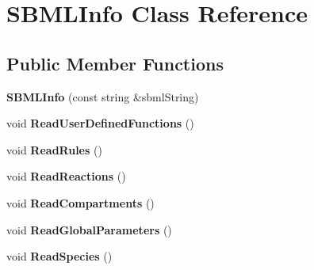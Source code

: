 \hypertarget{class_s_b_m_l_info}{\section{S\-B\-M\-L\-Info Class Reference}
\label{class_s_b_m_l_info}
}
\subsection*{Public Member Functions}
\begin{DoxyCompactItemize}
\item 
\hypertarget{class_s_b_m_l_info_a5dd247f49ffa438cc74052f4431c34d2}{{\bfseries S\-B\-M\-L\-Info} (const string \&sbml\-String)}\label{class_s_b_m_l_info_a5dd247f49ffa438cc74052f4431c34d2}

\item 
\hypertarget{class_s_b_m_l_info_a5a05609c78701252a1e96e8deb1c9e15}{void {\bfseries Read\-User\-Defined\-Functions} ()}\label{class_s_b_m_l_info_a5a05609c78701252a1e96e8deb1c9e15}

\item 
\hypertarget{class_s_b_m_l_info_a07aa9e9ecd2d139eeedf34972e9873d4}{void {\bfseries Read\-Rules} ()}\label{class_s_b_m_l_info_a07aa9e9ecd2d139eeedf34972e9873d4}

\item 
\hypertarget{class_s_b_m_l_info_ab7b1c3f75e311d8f7481928a515f2c1e}{void {\bfseries Read\-Reactions} ()}\label{class_s_b_m_l_info_ab7b1c3f75e311d8f7481928a515f2c1e}

\item 
\hypertarget{class_s_b_m_l_info_afe3bd496be77870cfd07f4f3c0e905af}{void {\bfseries Read\-Compartments} ()}\label{class_s_b_m_l_info_afe3bd496be77870cfd07f4f3c0e905af}

\item 
\hypertarget{class_s_b_m_l_info_a806c1e376f9a8346d0a3caae8f1603c4}{void {\bfseries Read\-Global\-Parameters} ()}\label{class_s_b_m_l_info_a806c1e376f9a8346d0a3caae8f1603c4}

\item 
\hypertarget{class_s_b_m_l_info_a4cce3381db7e4e873626b1bfa0c46f72}{void {\bfseries Read\-Species} ()}\label{class_s_b_m_l_info_a4cce3381db7e4e873626b1bfa0c46f72}

\end{DoxyCompactItemize}
